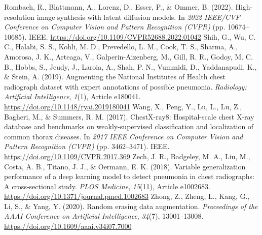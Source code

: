 \documentclass[11pt,a4paper]{article}
\begin{document}
\begin{thebibliography}{}
 Rombach, R., Blattmann, A., Lorenz, D., Esser, P., \& Ommer, B. (2022). High-resolution image synthesis with latent diffusion models. In \textit{2022 IEEE/CVF Conference on Computer Vision and Pattern Recognition (CVPR)} (pp. 10674--10685). IEEE. \url{https://doi.org/10.1109/CVPR52688.2022.01042}
 Shih, G., Wu, C. C., Halabi, S. S., Kohli, M. D., Prevedello, L. M., Cook, T. S., Sharma, A., Amorosa, J. K., Arteaga, V., Galperin-Aizenberg, M., Gill, R. R., Godoy, M. C. B., Hobbs, S., Jeudy, J., Laroia, A., Shah, P. N., Vummidi, D., Yaddanapudi, K., \& Stein, A. (2019). Augmenting the National Institutes of Health chest radiograph dataset with expert annotations of possible pneumonia. \textit{Radiology: Artificial Intelligence}, \textit{1}(1), Article e180041. \url{https://doi.org/10.1148/ryai.2019180041}
 Wang, X., Peng, Y., Lu, L., Lu, Z., Bagheri, M., \& Summers, R. M. (2017). ChestX-ray8: Hospital-scale chest X-ray database and benchmarks on weakly-supervised classification and localization of common thorax diseases. In \textit{2017 IEEE Conference on Computer Vision and Pattern Recognition (CVPR)} (pp. 3462--3471). IEEE. \url{https://doi.org/10.1109/CVPR.2017.369}
 Zech, J. R., Badgeley, M. A., Liu, M., Costa, A. B., Titano, J. J., \& Oermann, E. K. (2018). Variable generalization performance of a deep learning model to detect pneumonia in chest radiographs: A cross-sectional study. \textit{PLOS Medicine}, \textit{15}(11), Article e1002683. \url{https://doi.org/10.1371/journal.pmed.1002683}
 Zhong, Z., Zheng, L., Kang, G., Li, S., \& Yang, Y. (2020). Random erasing data augmentation. \textit{Proceedings of the AAAI Conference on Artificial Intelligence}, \textit{34}(7), 13001--13008. \url{https://doi.org/10.1609/aaai.v34i07.7000}
\end{thebibliography}
\end{document}
